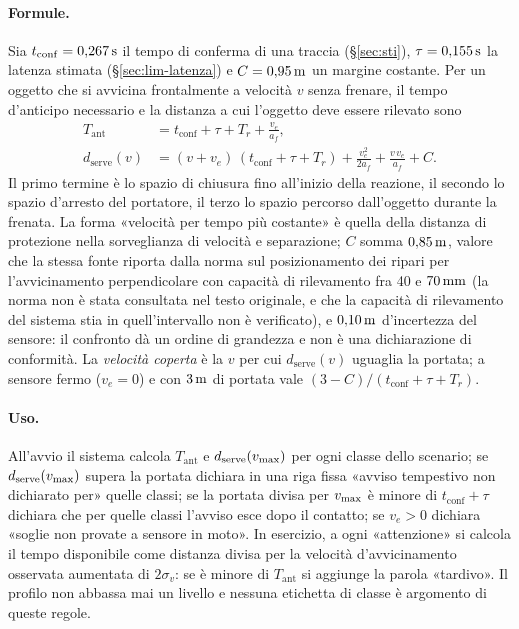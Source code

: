 \paragraph{Formule.} Sia $t_{\mathrm{conf}}=0{,}267\,\mathrm{s}$ il tempo di conferma di una traccia (\S\ref{sec:sti}), $\tau=0{,}155\,\mathrm{s}$ la latenza stimata (\S\ref{sec:lim-latenza}) e $C=0{,}95\,\mathrm{m}$ un margine costante. Per un oggetto che si avvicina frontalmente a velocità $v$ senza frenare, il tempo d'anticipo necessario e la distanza a cui l'oggetto deve essere rilevato sono
\begin{align}
T_{\mathrm{ant}} &= t_{\mathrm{conf}}+\tau+T_r+\frac{v_e}{a_f}, \label{eq:lim-tant}\\
d_{\mathrm{serve}}(v) &= (v+v_e)\,(t_{\mathrm{conf}}+\tau+T_r)+\frac{v_e^2}{2a_f}+\frac{v\,v_e}{a_f}+C. \label{eq:lim-dserve}
\end{align}
Il primo termine è lo spazio di chiusura fino all'inizio della reazione, il secondo lo spazio d'arresto del portatore, il terzo lo spazio percorso dall'oggetto durante la frenata. La forma «velocità per tempo più costante» è quella della distanza di protezione nella sorveglianza di velocità e separazione; $C$ somma $0{,}85\,\mathrm{m}$, valore che la stessa fonte riporta dalla norma sul posizionamento dei ripari per l'avvicinamento perpendicolare con capacità di rilevamento fra 40 e $70\,\mathrm{mm}$ \cite{marvel2017} (la norma non è stata consultata nel testo originale, e che la capacità di rilevamento del sistema stia in quell'intervallo non è verificato), e $0{,}10\,\mathrm{m}$ d'incertezza del sensore: il confronto dà un ordine di grandezza e non è una dichiarazione di conformità. La \emph{velocità coperta} è la $v$ per cui $d_{\mathrm{serve}}(v)$ uguaglia la portata; a sensore fermo ($v_e=0$) e con $3\,\mathrm{m}$ di portata vale $(3-C)/(t_{\mathrm{conf}}+\tau+T_r)$.

\paragraph{Uso.} All'avvio il sistema calcola $T_{\mathrm{ant}}$ e $d_{\mathrm{serve}}(v_{\max})$ per ogni classe dello scenario; se $d_{\mathrm{serve}}(v_{\max})$ supera la portata dichiara in una riga fissa «avviso tempestivo non dichiarato per» quelle classi; se la portata divisa per $v_{\max}$ è minore di $t_{\mathrm{conf}}+\tau$ dichiara che per quelle classi l'avviso esce dopo il contatto; se $v_e>0$ dichiara «soglie non provate a sensore in moto». In esercizio, a ogni «attenzione» si calcola il tempo disponibile come distanza divisa per la velocità d'avvicinamento osservata aumentata di $2\sigma_v$: se è minore di $T_{\mathrm{ant}}$ si aggiunge la parola «tardivo». Il profilo non abbassa mai un livello e nessuna etichetta di classe è argomento di queste regole.


